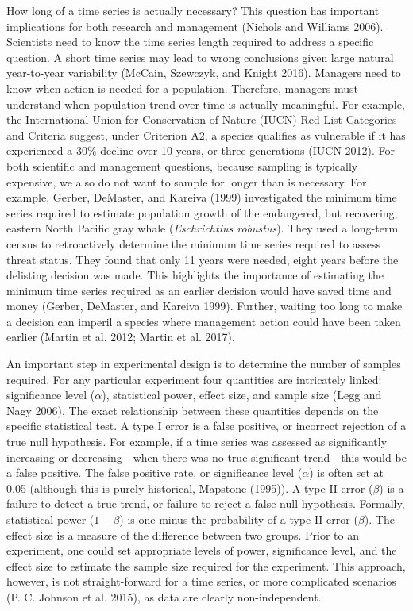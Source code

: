 \documentclass[12pt,]{article}
\begin{document}
\begin{spacing}{2}
How long of a time series is actually necessary? This question has
important implications for both research and management (Nichols and
Williams 2006). Scientists need to know the time series length required
to address a specific question. A short time series may lead to wrong
conclusions given large natural year-to-year variability (McCain,
Szewczyk, and Knight 2016). Managers need to know when action is needed
for a population. Therefore, managers must understand when population
trend over time is actually meaningful. For example, the International
Union for Conservation of Nature (IUCN) Red List Categories and Criteria
suggest, under Criterion A2, a species qualifies as vulnerable if it has
experienced a 30\% decline over 10 years, or three generations (IUCN
2012). For both scientific and management questions, because sampling is
typically expensive, we also do not want to sample for longer than is
necessary. For example, Gerber, DeMaster, and Kareiva (1999)
investigated the minimum time series required to estimate population
growth of the endangered, but recovering, eastern North Pacific gray
whale (\emph{Eschrichtius robustus}). They used a long-term census to
retroactively determine the minimum time series required to assess
threat status. They found that only 11 years were needed, eight years
before the delisting decision was made. This highlights the importance
of estimating the minimum time series required as an earlier decision
would have saved time and money (Gerber, DeMaster, and Kareiva 1999).
Further, waiting too long to make a decision can imperil a species where
management action could have been taken earlier (Martin et al. 2012;
Martin et al. 2017).

An important step in experimental design is to determine the number of
samples required. For any particular experiment four quantities are
intricately linked: significance level (\(\alpha\)), statistical power,
effect size, and sample size (Legg and Nagy 2006). The exact
relationship between these quantities depends on the specific
statistical test. A type I error is a false positive, or incorrect
rejection of a true null hypothesis. For example, if a time series was
assessed as significantly increasing or decreasing---when there was no
true significant trend---this would be a false positive. The false
positive rate, or significance level (\(\alpha\)) is often set at 0.05
(although this is purely historical, Mapstone (1995)). A type II error
(\(\beta\)) is a failure to detect a true trend, or failure to reject a
false null hypothesis. Formally, statistical power (\(1-\beta\)) is one
minus the probability of a type II error (\(\beta\)). The effect size is
a measure of the difference between two groups. Prior to an experiment,
one could set appropriate levels of power, significance level, and the
effect size to estimate the sample size required for the experiment.
This approach, however, is not straight-forward for a time series, or
more complicated scenarios (P. C. Johnson et al. 2015), as data are
clearly non-independent.


\end{spacing}
\end{document}
